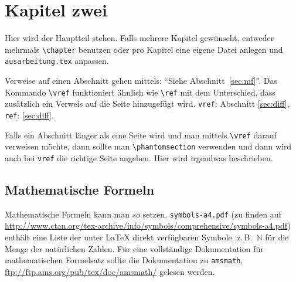 
\chapter{Kapitel zwei}

\label{chap:k2}
Hier wird der Hauptteil stehen. Falls mehrere Kapitel gewünscht, entweder mehrmals \texttt{\textbackslash{}chapter} benutzen oder pro Kapitel eine eigene Datei anlegen und \texttt{ausarbeitung.tex} anpassen.

Verweise auf einen Abschnitt gehen mittels: ``Siehe Abschnitt~\vref{sec:mf}''. Das Kommando \texttt{\textbackslash{}vref} funktioniert ähnlich wie \texttt{\textbackslash{}ref} mit dem Unterschied, dass zusätzlich ein Verweis auf die Seite hinzugefügt wird. \texttt{vref}: Abschnitt \vref{sec:diff}, \texttt{ref}: \ref{sec:diff}.

Falls ein Abschnitt länger als eine Seite wird und man mittels \texttt{\textbackslash{}vref} darauf
verweisen möchte, dann sollte man \texttt{\textbackslash{}phantomsection} verwenden und dann wird
auch bei \texttt{vref} die richtige Seite angeben.
\label{cooltarget}Hier wird irgendwas beschrieben.

\section{Mathematische Formeln}
\label{sec:mf}
Mathematische Formeln kann man $so$ setzen. \texttt{symbols-a4.pdf} (zu finden auf \url{http://www.ctan.org/tex-archive/info/symbols/comprehensive/symbols-a4.pdf}) enthält eine Liste der unter LaTeX direkt verfügbaren Symbole. z.\,B.\ $\mathbb{N}$ für die Menge der natürlichen Zahlen. Für eine vollständige Dokumentation für mathematischen Formelsatz sollte die Dokumentation zu \texttt{amsmath}, \url{ftp://ftp.ams.org/pub/tex/doc/amsmath/} gelesen werden.

